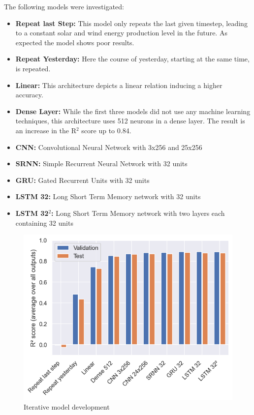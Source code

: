\documentclass[11pt,table]{article}
\begin{document}
The following models were investigated:

\begin{itemize}
\item \textbf{Repeat last Step:} This model only repeats the last given timestep, leading to a constant solar and wind energy production level in the future. As expected the model shows poor results. 
\item \textbf{Repeat Yesterday:} Here the course of yesterday, starting at the same time, is repeated. 
\item \textbf{Linear:} This architecture depicts a linear relation inducing a higher accuracy.
\item \textbf{Dense Layer:} While the first three models did not use any machine learning techniques, this architecture uses 512 neurons in a dense layer. The result is an increase in the R$^2$ score up to 0.84.
\item \textbf{CNN:} Convolutional Neural Network with 3x256 and 25x256
\item \textbf{SRNN:} Simple Recurrent Neural Network with 32 units
\item \textbf{GRU:} Gated Recurrent Units with 32 units
\item \textbf{LSTM 32:} Long Short Term Memory network with 32 units
\item \textbf{LSTM 32$^2$:} Long Short Term Memory network with two layers each containing 32 units
\end{itemize}


\begin{figure}[H]
	\centering
	\includegraphics[scale=0.6]{Figures/benchmarks.png}
	\caption{Iterative model development}
	\label{fig:benchmarks}
\end{figure} 
\end{document}
